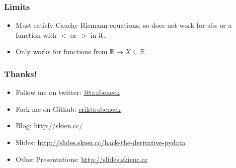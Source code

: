 \documentclass{beamer}
\def\R{\mathbb{R}}                     %
\begin{document}
\begin{frame}
\frametitle{Limits}

  \begin{itemize}
    \item Must satisfy Cauchy Riemann equations, so does not work for abs or a function with $<$ or $>$ in it.
    \item Only works for functions from $\R \to X \subseteq \R$.
  \end{itemize}

\end{frame}

\begin{frame}

\frametitle{Thanks!}

\begin{itemize}
  \item Follow me on twitter: \href{https://twitter.com/taubeneck}{@taubeneck}
  \item Fork me on Github: \href{https://github.com/eriktaubeneck}{eriktaubeneck}
  \item Blog: \url{http://skien.cc/}
  \item Slides: \url{http://slides.skien.cc/hack-the-derivative-pydata}
  \item Other Presentations: \url{http://slides.skienc.cc}
\end{itemize}

\end{frame}
\end{document}
